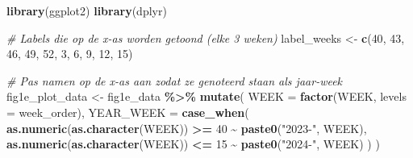 \documentclass[
]{book}
\newenvironment{Shaded}{\begin{snugshade}}{\end{snugshade}}
\newcommand{\AttributeTok}[1]{\textcolor[rgb]{0.13,0.29,0.53}{#1}}
\newcommand{\CommentTok}[1]{\textcolor[rgb]{0.56,0.35,0.01}{\textit{#1}}}
\newcommand{\DecValTok}[1]{\textcolor[rgb]{0.00,0.00,0.81}{#1}}
\newcommand{\FunctionTok}[1]{\textcolor[rgb]{0.13,0.29,0.53}{\textbf{#1}}}
\newcommand{\NormalTok}[1]{#1}
\newcommand{\OtherTok}[1]{\textcolor[rgb]{0.56,0.35,0.01}{#1}}
\newcommand{\SpecialCharTok}[1]{\textcolor[rgb]{0.81,0.36,0.00}{\textbf{#1}}}
\newcommand{\StringTok}[1]{\textcolor[rgb]{0.31,0.60,0.02}{#1}}
\begin{document}
\begin{Shaded}
\begin{Highlighting}[]
\FunctionTok{library}\NormalTok{(ggplot2)}
\FunctionTok{library}\NormalTok{(dplyr)}

\CommentTok{\# Labels die op de x{-}as worden getoond (elke 3 weken)}
\NormalTok{label\_weeks }\OtherTok{\textless{}{-}} \FunctionTok{c}\NormalTok{(}\DecValTok{40}\NormalTok{, }\DecValTok{43}\NormalTok{, }\DecValTok{46}\NormalTok{, }\DecValTok{49}\NormalTok{, }\DecValTok{52}\NormalTok{, }\DecValTok{3}\NormalTok{, }\DecValTok{6}\NormalTok{, }\DecValTok{9}\NormalTok{, }\DecValTok{12}\NormalTok{, }\DecValTok{15}\NormalTok{)}

\CommentTok{\# Pas namen op de x{-}as aan zodat ze genoteerd staan als jaar{-}week}
\NormalTok{fig1e\_plot\_data }\OtherTok{\textless{}{-}}\NormalTok{ fig1e\_data }\SpecialCharTok{\%\textgreater{}\%}
  \FunctionTok{mutate}\NormalTok{(}
    \AttributeTok{WEEK =} \FunctionTok{factor}\NormalTok{(WEEK, }\AttributeTok{levels =}\NormalTok{ week\_order),}
    \AttributeTok{YEAR\_WEEK =} \FunctionTok{case\_when}\NormalTok{(}
      \FunctionTok{as.numeric}\NormalTok{(}\FunctionTok{as.character}\NormalTok{(WEEK)) }\SpecialCharTok{\textgreater{}=} \DecValTok{40} \SpecialCharTok{\textasciitilde{}} \FunctionTok{paste0}\NormalTok{(}\StringTok{"2023{-}"}\NormalTok{, WEEK),}
      \FunctionTok{as.numeric}\NormalTok{(}\FunctionTok{as.character}\NormalTok{(WEEK)) }\SpecialCharTok{\textless{}=} \DecValTok{15} \SpecialCharTok{\textasciitilde{}} \FunctionTok{paste0}\NormalTok{(}\StringTok{"2024{-}"}\NormalTok{, WEEK)}
\NormalTok{    )}
\NormalTok{  )}


\end{Highlighting}
\end{Shaded}
\end{document}
